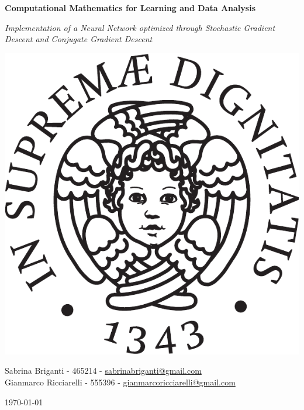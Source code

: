 \begin{center}
    \Huge
    \textbf{Computational Mathematics for Learning and Data Analysis}

    \vspace*{1cm}

    \LARGE
        \textit{
        Implementation of a Neural Network optimized through Stochastic Gradient Descent and Conjugate Gradient
        Descent}

    \vfill

    \includegraphics[scale=0.5]{img/cherubino_black.pdf}

    \vspace*{1cm}

    \Large
    Sabrina Briganti - 465214 - \href{mailto:sabrinabriganti@gmail.com}{sabrinabriganti@gmail.com}\\
    Gianmarco Ricciarelli - 555396 - \href{mailto:gianmarcoricciarelli@gmail.com}
    {gianmarcoricciarelli@gmail.com}

    \vspace*{1cm}

    \today
\end{center}
